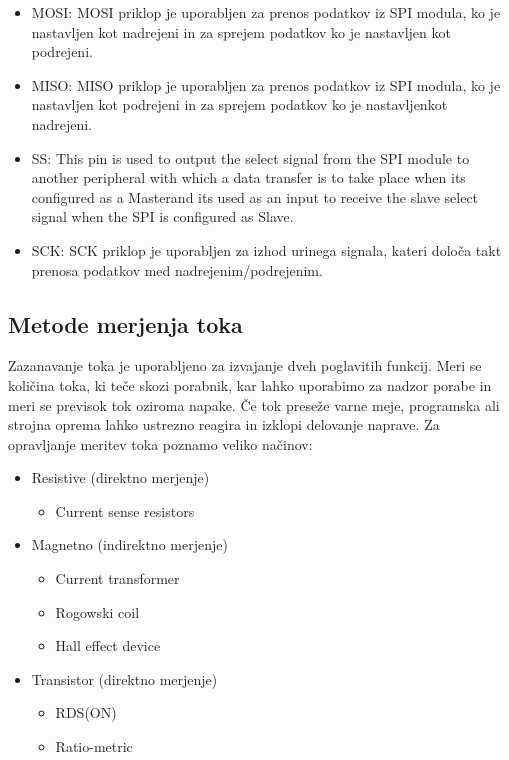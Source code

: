 \documentclass[12pt,a4paper,titlepage,openany]{report}
\begin{document}
\begin{itemize}
\item MOSI: MOSI priklop je uporabljen za prenos podatkov iz SPI modula, ko je nastavljen kot nadrejeni in za sprejem podatkov ko je nastavljen kot podrejeni.
\item MISO: MISO priklop je uporabljen za prenos podatkov iz SPI modula, ko je nastavljen kot podrejeni in za sprejem podatkov ko je nastavljenkot nadrejeni.
\item SS: This pin is used to output the select signal from the SPI module to another peripheral with which a data transfer is to take place when its configured as a Masterand its used as an input to receive the slave select signal when the SPI is configured as Slave.
\item SCK: SCK priklop je uporabljen za izhod urinega signala, kateri določa takt prenosa podatkov med nadrejenim/podrejenim.
\end{itemize}

\subsection{Metode merjenja toka}
Zazanavanje toka je uporabljeno za izvajanje dveh poglavitih funkcij. Meri se količina toka, ki teče skozi porabnik, kar lahko uporabimo za nadzor porabe in meri se previsok tok oziroma napake. Če tok preseže varne meje, programska ali strojna oprema lahko ustrezno reagira in izklopi delovanje naprave. Za opravljanje meritev toka poznamo veliko načinov:

\begin{itemize}
\item Resistive (direktno merjenje)

\begin{itemize}
\item Current sense resistors
\end{itemize}

 \item Magnetno (indirektno merjenje)

\begin{itemize}
\item Current transformer
\item Rogowski coil
\item Hall effect device
\end{itemize}

\item Transistor (direktno merjenje)

\begin{itemize}
\item RDS(ON)
\item Ratio-metric
\end{itemize}

\end{itemize}
\end{document}
